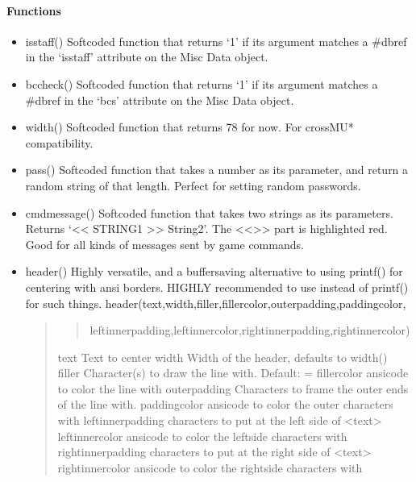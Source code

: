 \documentclass[letterpaper,10pt,english]{sphinxmanual}
\begin{document}
\paragraph{Functions}
\label{\detokenize{gettingstarted:functions}}\begin{itemize}
\item {} 
\sphinxAtStartPar
isstaff() \sphinxhyphen{} Softcoded function that returns ‘1’ if its argument matches
a \#dbref in the ‘isstaff’ attribute on the Misc Data object.

\item {} 
\sphinxAtStartPar
bccheck() \sphinxhyphen{} Softcoded function that returns ‘1’ if its argument matches
a \#dbref in the ‘bcs’ attribute on the Misc Data object.

\item {} 
\sphinxAtStartPar
width() \sphinxhyphen{} Softcoded function that returns 78 for now. For cross\sphinxhyphen{}MU*
compatibility.

\item {} 
\sphinxAtStartPar
pass() \sphinxhyphen{} Softcoded function that takes a number as its parameter, and return
a random string of that length. Perfect for setting random passwords.

\item {} 
\sphinxAtStartPar
cmdmessage() \sphinxhyphen{} Softcoded function that takes two strings as its parameters.
Returns ‘\textless{}\textless{} STRING1 \textgreater{}\textgreater{} String2’. The \textless{}\textless{}\textgreater{}\textgreater{} part is highlighted red. Good for
all kinds of messages sent by game commands.

\item {} 
\sphinxAtStartPar
header() \sphinxhyphen{} Highly versatile, and a buffer\sphinxhyphen{}saving alternative
to using printf() for centering with ansi borders. HIGHLY recommended to use
instead of printf() for such things.
header(text,width,filler,fillercolor,outerpadding,paddingcolor,
\begin{quote}
\begin{quote}

\sphinxAtStartPar
leftinnerpadding,leftinnercolor,rightinnerpadding,rightinnercolor)
\end{quote}

\sphinxAtStartPar
text \sphinxhyphen{} Text to center
width \sphinxhyphen{} Width of the header, defaults to width()
filler \sphinxhyphen{} Character(s) to draw the line with. Default: =
fillercolor \sphinxhyphen{} ansicode to color the line with
outerpadding \sphinxhyphen{} Characters to frame the outer ends of the line with.
paddingcolor \sphinxhyphen{} ansicode to color the outer characters with
leftinnerpadding \sphinxhyphen{} characters to put at the left side of \textless{}text\textgreater{}
leftinnercolor \sphinxhyphen{} ansicode to color the leftside characters with
rightinnerpadding \sphinxhyphen{} characters to put at the right side of \textless{}text\textgreater{}
rightinnercolor \sphinxhyphen{} ansicode to color the rightside characters with
\end{quote}


\end{itemize}
\end{document}
